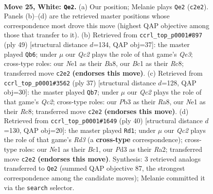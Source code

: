 \documentclass[11pt]{article}
\begin{document}
\clearpage

\begin{figure}[p]\centering
\begin{subfigure}{0.46\textwidth}\centering
\resizebox{\linewidth}{!}{%
\newchessgame
\chessboard[
  setfen={2rq3r/4bp1k/2n2n2/p6p/1p1p2p1/1P1P2P1/PRQ2P1P/RNB1N1K1 w - - 6 25},
  showmover=false,
  pgfstyle=straightmove, color=movearrow, markmove={c2-e2}
]}
\caption{}
\end{subfigure}\hfill
\begin{subfigure}{0.46\textwidth}\centering
\resizebox{\linewidth}{!}{%
\newchessgame
\chessboard[
  setfen={b1rr1nk1/5pp1/4qn1p/p1pp4/P7/1PN1PNP1/Q3BPP1/2RR2K1 b - - 0 25},
  showmover=false,
  pgfstyle=straightmove, color=movearrow, markmove={e6-b6}
]}
\caption{}
\end{subfigure}
\\[4pt]
\begin{subfigure}{0.46\textwidth}\centering
\resizebox{\linewidth}{!}{%
\newchessgame
\chessboard[
  setfen={r1r3k1/2q1bppp/pp1ppnn1/8/2P1P3/1PN2NP1/P2BQP1P/2RR2K1 b - - 2 19},
  showmover=false,
  pgfstyle=straightmove, color=movearrow, markmove={c7-b7}
]}
\caption{}
\end{subfigure}\hfill
\begin{subfigure}{0.46\textwidth}\centering
\resizebox{\linewidth}{!}{%
\newchessgame
\chessboard[
  setfen={r2qr1k1/4bpp1/2p2n2/p1Ppn2p/Np6/PP1R2P1/R1Q1PPBP/2B3K1 w - - 0 21},
  showmover=false,
  pgfstyle=straightmove, color=movearrow, markmove={d3-d1}
]}
\caption{}
\end{subfigure}
\caption{\textbf{Move 25, White: \texttt{Qe2}.} (a) Our position; Melanie plays \texttt{Qe2} (\texttt{c2e2}). Panels (b)--(d) are the retrieved master positions whose correspondence most drove this move (highest QAP objective among those that transfer to it). (b) Retrieved from \texttt{ccrl\_top\_p0001\#897} (ply 49) [structural distance $d$=134, QAP obj=37]: the master played \texttt{Qb6}; under $\mu$ our \emph{Qc2} plays the role of that game's \emph{Qe3}; cross-type roles: our \emph{N}e1 as their \emph{B}a8, our \emph{B}c1 as their \emph{R}c8; transferred move \texttt{c2e2} \textbf{(endorses this move)}. (c) Retrieved from \texttt{ccrl\_top\_p0001\#3562} (ply 37) [structural distance $d$=128, QAP obj=30]: the master played \texttt{Qb7}; under $\mu$ our \emph{Qc2} plays the role of that game's \emph{Qc2}; cross-type roles: our \emph{P}b3 as their \emph{R}a8, our \emph{N}e1 as their \emph{R}c8; transferred move \texttt{c2e2} \textbf{(endorses this move)}. (d) Retrieved from \texttt{ccrl\_top\_p0001\#1649} (ply 40) [structural distance $d$=130, QAP obj=20]: the master played \texttt{Rd1}; under $\mu$ our \emph{Qc2} plays the role of that game's \emph{Rd3} (a \textbf{cross-type} correspondence); cross-type roles: our \emph{N}e1 as their \emph{B}c1, our \emph{P}d3 as their \emph{R}a2; transferred move \texttt{c2e2} \textbf{(endorses this move)}. Synthesis: 3 retrieved analogs transferred to \texttt{Qe2} (summed QAP objective 87, the strongest correspondence among the candidate moves); Melanie committed it via the \texttt{search} selector.}
\label{fig:thought-m48}
\end{figure}
\end{document}
